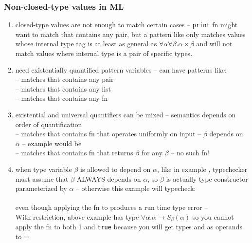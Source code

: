\documentclass[12pt]{article}	%
\begin{document}
\subsubsection*{Non-closed-type \Dynamic values in ML}
\begin{enumerate}
	\item	closed-type \Dynamic values are not enough to match certain cases -- \texttt{print} fn might want to match \Dynamic that contains any pair, but a pattern like  only matches \Dynamic values whose internal type tag is at least as general as $\forall\alpha\forall\beta.\alpha\times\beta$ and will not match \Dynamic values where internal type is a pair of specific types.
	\item need existentially quantified pattern variables -- can have patterns like:\\
	 -- matches \Dynamic that contains any pair \\
	 -- matches \Dynamic that contains any list \\
	 -- matches \Dynamic that contains any fn \\

	\item existential and universal quantifiers can be mixed -- semantics depends on order of quantification\\
	 -- matches \Dynamic that contains fn that operates uniformly on input -- $\beta$ depends on $\alpha$ -- example would be  \\
	 -- matches \Dynamic that contains fn that returns $\beta$ for any $\beta$ -- no such fn!
	\item when type variable $\beta$ is allowed to depend on $\alpha$, like in example , typechecker must assume that $\beta$ ALWAYS depends on $\alpha$, so $\beta$ is actually type constructor parameterized by $\alpha$ -- otherwise this example will typecheck: \\
	 \\
	even though applying the fn to  produces a run time type error -- \\
	With restriction, above example has type $\forall\alpha.\alpha\rightarrow S_\beta(\alpha)$ so you cannot apply the fn to both 1 and \texttt{true} because you will get types  and  as operands to =
	

\end{enumerate}
\end{document}
